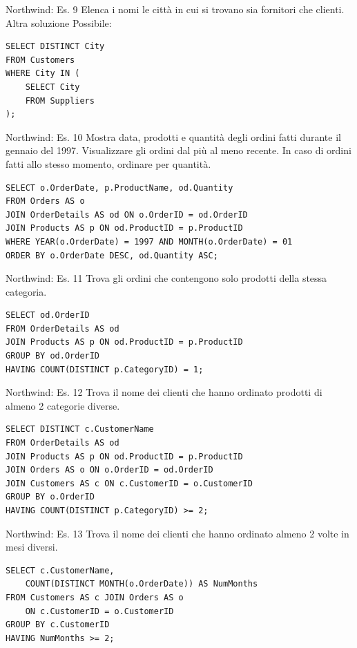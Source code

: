 \begin{frame}[fragile]{Northwind: Es. 9}
Elenca i nomi le citt\`a in cui si trovano sia fornitori che clienti.
\newline
\newline
Altra soluzione Possibile:
\begin{lstlisting}
SELECT DISTINCT City
FROM Customers
WHERE City IN (
    SELECT City
    FROM Suppliers
);
\end{lstlisting}
\end{frame}
%
\begin{frame}[fragile]{Northwind: Es. 10}
Mostra data, prodotti e quantit\`a degli ordini fatti durante il gennaio del 1997.
Visualizzare gli ordini dal pi\`u al meno recente.
In caso di ordini fatti allo stesso momento, ordinare per quantit\`a.
\pause
\begin{lstlisting}
SELECT o.OrderDate, p.ProductName, od.Quantity
FROM Orders AS o 
JOIN OrderDetails AS od ON o.OrderID = od.OrderID
JOIN Products AS p ON od.ProductID = p.ProductID
WHERE YEAR(o.OrderDate) = 1997 AND MONTH(o.OrderDate) = 01
ORDER BY o.OrderDate DESC, od.Quantity ASC;
\end{lstlisting}
\end{frame}
%
\begin{frame}[fragile]{Northwind: Es. 11}
Trova gli ordini che contengono solo prodotti della stessa categoria.
\pause
\begin{lstlisting}
SELECT od.OrderID
FROM OrderDetails AS od
JOIN Products AS p ON od.ProductID = p.ProductID
GROUP BY od.OrderID
HAVING COUNT(DISTINCT p.CategoryID) = 1;
\end{lstlisting}
\end{frame}
%
\begin{frame}[fragile]{Northwind: Es. 12}
Trova il nome dei clienti che hanno ordinato prodotti di almeno 2 categorie diverse.
\pause
\begin{lstlisting}
SELECT DISTINCT c.CustomerName
FROM OrderDetails AS od
JOIN Products AS p ON od.ProductID = p.ProductID
JOIN Orders AS o ON o.OrderID = od.OrderID
JOIN Customers AS c ON c.CustomerID = o.CustomerID
GROUP BY o.OrderID
HAVING COUNT(DISTINCT p.CategoryID) >= 2;
\end{lstlisting}
\end{frame}
%
\begin{frame}[fragile]{Northwind: Es. 13}
Trova il nome dei clienti che hanno ordinato almeno 2 volte in mesi diversi.
\pause
\begin{lstlisting}
SELECT c.CustomerName, 
    COUNT(DISTINCT MONTH(o.OrderDate)) AS NumMonths
FROM Customers AS c JOIN Orders AS o
	ON c.CustomerID = o.CustomerID
GROUP BY c.CustomerID
HAVING NumMonths >= 2;
\end{lstlisting}
\end{frame}
